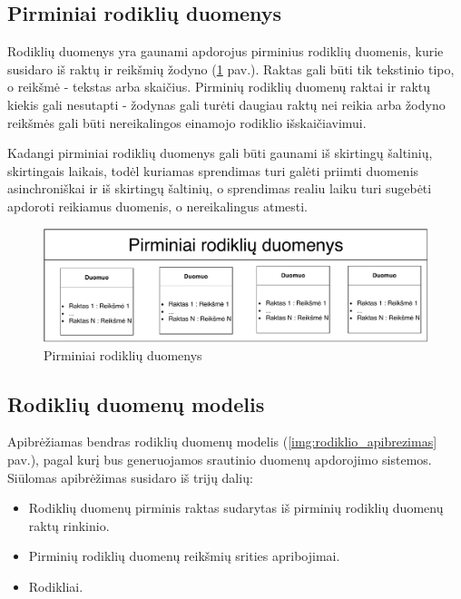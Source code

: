 \documentclass{VUMIFPSbakalaurinis}
\begin{document}
\subsection{Pirminiai rodiklių duomenys}

Rodiklių duomenys yra gaunami apdorojus pirminius rodiklių duomenis, kurie susidaro iš raktų ir reikšmių žodyno (\ref{img:duomenys} pav.). Raktas gali būti tik tekstinio tipo, o reikšmė - tekstas arba skaičius. Pirminių rodiklių duomenų raktai ir raktų kiekis gali nesutapti - žodynas gali turėti daugiau raktų nei reikia arba žodyno reikšmės gali būti nereikalingos einamojo rodiklio išskaičiavimui. \par 
Kadangi pirminiai rodiklių duomenys gali būti gaunami iš skirtingų šaltinių, skirtingais laikais, todėl kuriamas sprendimas turi galėti priimti duomenis asinchroniškai ir iš skirtingų šaltinių, o sprendimas realiu laiku turi sugebėti apdoroti reikiamus duomenis, o nereikalingus atmesti. 

\begin{figure}[H]
    \centering
    \includegraphics[width=1\textwidth]{img/duomenys.pdf}
    \caption{Pirminiai rodiklių duomenys}
    \label{img:duomenys}
\end{figure}

\subsection{Rodiklių duomenų modelis}

Apibrėžiamas bendras rodiklių duomenų modelis (\ref{img:rodiklio_apibrezimas} pav.), pagal kurį bus generuojamos srautinio duomenų apdorojimo sistemos. Siūlomas apibrėžimas susidaro iš trijų dalių: 
\begin{itemize}
    \item Rodiklių duomenų pirminis raktas sudarytas iš pirminių rodiklių duomenų raktų rinkinio.
    \item Pirminių rodiklių duomenų reikšmių srities apribojimai.
    \item Rodikliai. 
\end{itemize}
\end{document}
